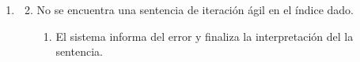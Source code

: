 \begin{framed}
\begin{description}
\begin{enumerate}
\begin {enumerate}
\begin{enumerate}
         \end{enumerate}
      \end{enumerate}
   \end{enumerate}
   \begin{enumerate} \itemsep1pt \parskip0pt 
   \setcounter{enumi}{0}
   \renewcommand{\labelenumi}{}
   \renewcommand{\labelenumiii}{\arabic{enumiii}.}
   \renewcommand{\labelenumii}{\arabic{enumi}\alph{enumii}.}
      \item 
      \begin {enumerate}
         \setcounter{enumii}{1}
         \item No se encuentra una sentencia de iteración ágil en el índice dado.
         \begin{enumerate}
         \item El sistema informa del error y finaliza la interpretación del 
         la sentencia.
         \end{enumerate}
      \end{enumerate}
   \end{enumerate}
\end{description}
 \FloatBarrier
\end{framed}
